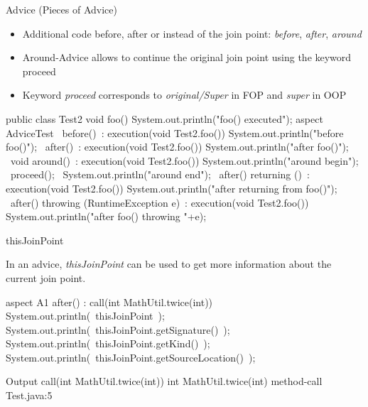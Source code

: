 \begin{frame}[b,fragile]{Advice (Pieces of Advice)}
	\vspace{-12mm}
	\begin{fancycolumns}[widths={38}]
		\begin{note}{}
			\begin{itemize}
				\item Additional code before, after or instead of the join point: \emph{before}, \emph{after}, \emph{around}
				\item Around-Advice allows to continue the original join point using the keyword proceed
				\item Keyword \emph{proceed} corresponds to \emph{original/Super} in FOP and \emph{super} in OOP
			\end{itemize}
		\end{note}
	\nextcolumn
\begin{codetight}{}
public class Test2 {
	void foo() {
		System.out.println("foo() executed");
	}
}
aspect AdviceTest {
	~before()~: execution(void Test2.foo()) {
		System.out.println("before foo()");
	}
	~after()~: execution(void Test2.foo()) {
		System.out.println("after foo()");
	}
	~void around()~: execution(void Test2.foo()) {
		System.out.println("around begin");
		~proceed();~
		System.out.println("around end");
	}
	~after() returning ()~: execution(void Test2.foo()) {
		System.out.println("after returning from foo()");
	}
	~after() throwing (RuntimeException e)~: execution(void Test2.foo()) {
		System.out.println("after foo() throwing "+e);
	}
}
\end{codetight} %
	\end{fancycolumns}
\end{frame}

\begin{frame}[fragile]{thisJoinPoint}
	\begin{fancycolumns}[widths={30},animation=none]
		\begin{note}{}
			In an advice, \emph{thisJoinPoint} can be used to get more information about the current join point.
		\end{note}
	\nextcolumn
\begin{codetight}{}
aspect A1 {
	after() : call(int MathUtil.twice(int)) {
		System.out.println(~thisJoinPoint~);
		System.out.println(~thisJoinPoint.getSignature()~);
		System.out.println(~thisJoinPoint.getKind()~);
		System.out.println(~thisJoinPoint.getSourceLocation()~);
	}
}
\end{codetight}
\begin{codetight}{Output}
call(int MathUtil.twice(int))
int MathUtil.twice(int)
method-call
Test.java:5
\end{codetight}
	\end{fancycolumns}
\end{frame}

